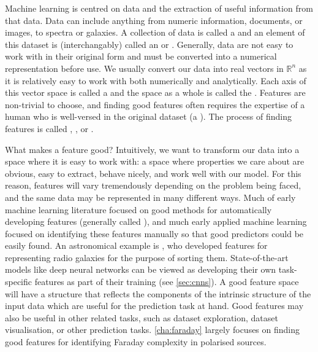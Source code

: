     Machine learning is centred on data and the extraction of useful information from that data. Data can include anything from numeric information, documents, or images, to spectra or galaxies. A collection of data is called a  and an element of this dataset is (interchangably) called an  or . Generally, data are not easy to work with in their original form and must be converted into a numerical representation before use. We usually convert our data into real vectors in $\mathbb R^n$ as it is relatively easy to work with both numerically and analytically. Each axis of this vector space is called a  and the space as a whole is called the . Features are non-trivial to choose, and finding good features often requires the expertise of a human who is well-versed in the original dataset (a ). The process of finding features is called , , or .

    What makes a feature good? Intuitively, we want to transform our data into a space where it is easy to work with: a space where properties we care about are obvious, easy to extract, behave nicely, and work well with our model. For this reason, features will vary tremendously depending on the problem being faced, and the same data may be represented in many different ways. Much of early machine learning literature focused on good methods for automatically developing features (generally called ), and much early applied machine learning focused on identifying these features manually so that good predictors could be easily found. An astronomical example is \citet{proctor06}, who developed features for representing radio galaxies for the purpose of sorting them. State-of-the-art models like deep neural networks \citep[e.g.][]{dieleman15cnn} can be viewed as developing their own task-specific features as part of their training (see \autoref{sec:cnns}). A good feature space will have a structure that reflects the components of the intrinsic structure of the input data which are useful for the prediction task at hand. Good features may also be useful in other related tasks, such as dataset exploration, dataset visualisation, or other prediction tasks. \autoref{cha:faraday} largely focuses on finding good features for identifying Faraday complexity in polarised sources.

